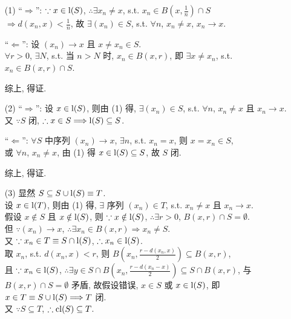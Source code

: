 \documentclass{note}
\begin{document}
\begin{pf}
    \begin{itemize}
        \item[(1)] ``$\Longrightarrow$'': $\because x\in\operatorname{l}(S)$, $\therefore\exists x_n\neq x$, s.t. $x_n\in B\left(x,\frac{1}{n}\right)\cap S$\\
        $\Longrightarrow d(x_n,x)<\frac{1}{n}$, 故 $\exists(x_n)\in S$, s.t. $\forall n$, $x_n\neq x$, $x_n\rightarrow x$.

        ``$\Longleftarrow$'': 设 $(x_n)\rightarrow x$ 且 $x\neq x_n\in S$.\\
        $\forall r>0$, $\exists N$, s.t. 当 $n>N$ 时, $x_n\in B(x,r)$, 即 $\exists x\neq x_n$, s.t. $x_n\in B(x,r)\cap S$.

        综上, 得证.
        \item[(2)] ``$\Longrightarrow$'': 设 $x\in\operatorname{l}(S)$, 则由 (1) 得, $\exists(x_n)\in S$, s.t. $\forall n$, $x_n\neq x$ 且 $x_n\rightarrow x$.\\
        又 $\because S$ 闭, $\therefore x\in S\Longrightarrow\operatorname{l}(S)\subseteq S$.

        ``$\Longleftarrow$'': $\forall S$ 中序列 $(x_n)\rightarrow x$, $\exists n$, s.t. $x_n=x$, 则 $x=x_n\in S$,\\
        或 $\forall n$, $x_n\neq x$, 由 (1) 得 $x\in\operatorname{l}(S)\subseteq S$, 故 $S$ 闭.

        综上, 得证.
        \item[(3)] 显然 $S\subseteq S\cup\operatorname{l}(S)\equiv T$.\\
        设 $x\in\operatorname{l}(T)$, 则由 (1) 得, $\exists$ 序列 $(x_n)\in T$, s.t. $x_n\neq x$ 且 $x_n\rightarrow x$.\\
        假设 $x\notin S$ 且 $x\notin\operatorname{l}(S)$, 则 $\because x\notin\operatorname{l}(S)$, $\therefore\exists r>0$, $B(x,r)\cap S=\emptyset$.\\
        但 $\because(x_n)\rightarrow x$, $\therefore\exists x_n\in B(x,r)\Longrightarrow x_n\neq S$.\\
        又 $\because x_n\in T\equiv S\cap\operatorname{l}(S)$, 
        $\therefore x_n\in\operatorname{l}(S)$.\\
        取 $x_n$, s.t. $d(x_n,x)<r$, 则 $B\left(x_n,\frac{r-d(x_n,x)}{2}\right)\subseteq B(x,r)$,\\
        且 $\because x_n\in\operatorname{l}(S)$, $\therefore\exists y\in S\cap B\left(x_n,\frac{r-d(x_n-x)}{2}\right)\subseteq S\cap B(x,r)$, 与 $B(x,r)\cap S=\emptyset$ 矛盾, 故假设错误, $x\in S$ 或 $x\in\operatorname{l}(S)$, 即 $x\in T\equiv S\cup \operatorname{l}(S)\Longrightarrow T$ 闭.\\
        又 $\because S\subseteq T$, $\therefore\operatorname{cl}(S)\subseteq T$.


\end{itemize}
\end{pf}
\end{document}
